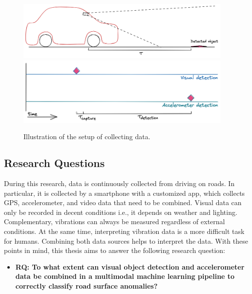 \begin{figure}[ht]
    \begin{center}
    \includegraphics[width=0.95\textwidth]{images/1_introduction/setup-schema.png}
	\includegraphics[width=0.95\textwidth,keepaspectratio]{images/2_literature/time-line-synchonization.png}
    \end{center}
    \captionsetup{width=.95\textwidth}
    \caption{Illustration of the setup of collecting data.}
    \label{fig:time-synchronization}
\end{figure}




\subsection{Research Questions}

During this research, data is continuously collected from driving on roads. In particular, it is collected by a smartphone with a customized app, which collects GPS, accelerometer, and video data that need to be combined. Visual data can only be recorded in decent conditions i.e., it depends on weather and lighting. Complementary, vibrations can always be measured regardless of external conditions. At the same time, interpreting vibration data is a more difficult task for humans. Combining both data sources helps to interpret the data. With these points in mind, this thesis aims to answer the following research question:

\begin{itemize}
\item \textbf{RQ: To what extent can visual object detection and accelerometer data be combined in a multimodal machine learning pipeline to correctly classify road surface anomalies?}
\end{itemize}

